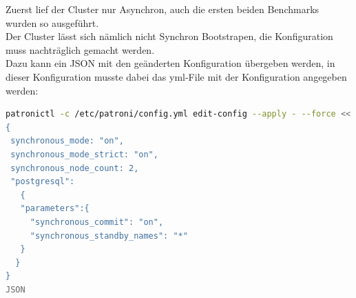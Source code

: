 \begin{flushleft}
    Zuerst lief der Cluster nur Asynchron, auch die ersten beiden Benchmarks wurden so ausgeführt.\\
    Der Cluster lässt sich nämlich nicht Synchron Bootstrapen, die Konfiguration muss nachträglich gemacht werden.\\
    Dazu kann ein JSON mit den geänderten Konfiguration übergeben werden, in dieser Konfiguration musste dabei das yml-File mit der Konfiguration angegeben werden:
\lstset{style=gra_codestyle}
\begin{lstlisting}[language=bash, caption=Patroni - Synchrone Replikation setzen,captionpos=b,label={lst:patroni_set_sync_replication},breaklines=true]
patronictl -c /etc/patroni/config.yml edit-config --apply - --force <<'JSON'
{
 synchronous_mode: "on",
 synchronous_mode_strict: "on",
 synchronous_node_count: 2,
 "postgresql":
   {
   "parameters":{
     "synchronous_commit": "on",
     "synchronous_standby_names": "*"
   }
  }
}
JSON
\end{lstlisting}
\end{flushleft}